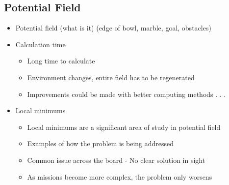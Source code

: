 \documentclass[numbered,pdftex]{ohio-etd}
\begin{document}
\subsection{Potential Field}
\begin{itemize}
\item Potential field (what is it) (edge of bowl, marble, goal, obstacles)
\item Calculation time
\begin{itemize}
\item Long time to calculate
\item Environment changes, entire field has to be regenerated
\item Improvements could be made with better computing methods . . .
\end{itemize}

\item Local minimums
\begin{itemize}
\item Local minimums are a significant area of study in potential field
\item Examples of how the problem is being addressed
\item Common issue across the board - No clear solution in sight
\item As missions become more complex, the problem only worsens
\end{itemize}

\end{itemize}
\end{document}
